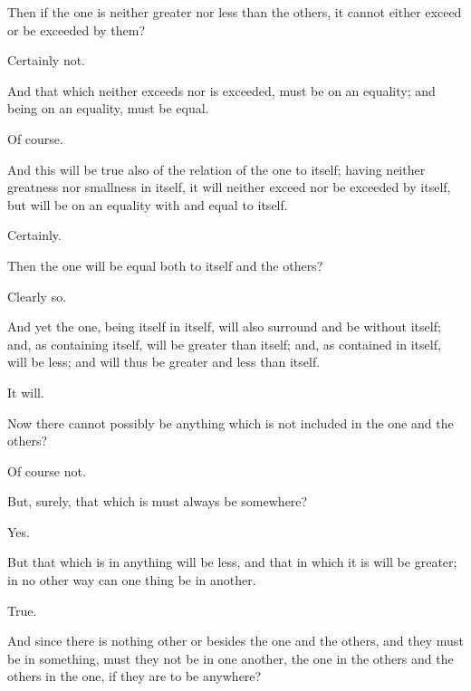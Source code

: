 \documentclass[11pt,letter]{article}
\begin{document}
\par  Then if the one is neither greater nor less than the others, it cannot either exceed or be exceeded by them?

\par  Certainly not.

\par  And that which neither exceeds nor is exceeded, must be on an equality; and being on an equality, must be equal.

\par  Of course.

\par  And this will be true also of the relation of the one to itself; having neither greatness nor smallness in itself, it will neither exceed nor be exceeded by itself, but will be on an equality with and equal to itself.

\par  Certainly.

\par  Then the one will be equal both to itself and the others?

\par  Clearly so.

\par  And yet the one, being itself in itself, will also surround and be without itself; and, as containing itself, will be greater than itself; and, as contained in itself, will be less; and will thus be greater and less than itself.

\par  It will.

\par  Now there cannot possibly be anything which is not included in the one and the others?

\par  Of course not.

\par  But, surely, that which is must always be somewhere?

\par  Yes.

\par  But that which is in anything will be less, and that in which it is will be greater; in no other way can one thing be in another.

\par  True.

\par  And since there is nothing other or besides the one and the others, and they must be in something, must they not be in one another, the one in the others and the others in the one, if they are to be anywhere?
\end{document}
